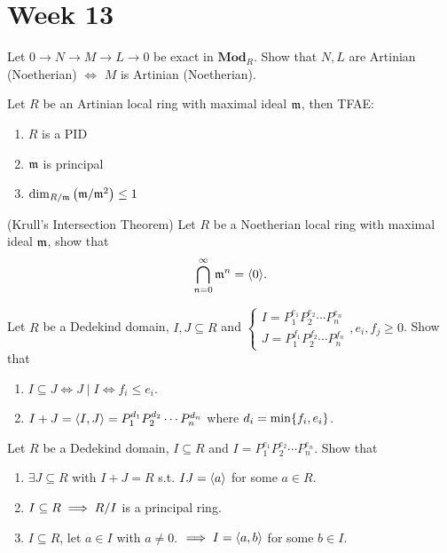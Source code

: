 
\section{Week 13}

\begin{exercise}
  Let $0 \to N \to M \to L \to 0$ be exact in $\mathbf{Mod}_R$.
  Show that $N, L$ are Artinian (Noetherian) $\iff$ $M$ is Artinian (Noetherian).
\end{exercise}

\begin{exercise}
  Let $R$ be an Artinian local ring with maximal ideal $\mathfrak{m}$, 
  then TFAE:
  \begin{enumerate}
    \item $R$ is a PID
    \item $\mathfrak{m}$ is principal
    \item $\dim_{R/\mathfrak{m}} \left( \mathfrak{m}/\mathfrak{m}^2 \right) \leq 1$
  \end{enumerate}
\end{exercise}

\begin{exercise}{(Krull's Intersection Theorem)}
  Let $R$ be a Noetherian local ring with maximal ideal $\mathfrak{m}$, show that
  \[ \bigcap\limits_{n=0}^{\infty} \mathfrak{m}^n = \langle0\rangle. \]
\end{exercise}

\begin{exercise}
  Let $R$ be a Dedekind domain, $I, J \subseteq R$ and
  $\begin{cases}
    I = P_1^{e_1}P_2^{e_2} \dotsm P_n^{e_n} \\
    J = P_1^{f_1}P_2^{f_2} \dotsm P_n^{f_n}
  \end{cases}, e_i, f_j \ge 0$.
  Show that
  \begin{enumerate}
    \item $I \subseteq J \iff J \mid I \iff f_i \le e_i$.
    \item $I + J = \langle I, J\rangle = P_1^{d_1}P_2^{d_2} \dotsm P_n^{d_n}$ where
      $d_i = \min\lbrace f_i, e_i\rbrace$.
  \end{enumerate}
\end{exercise}

\begin{exercise}
  Let $R$ be a Dedekind domain, $I \subseteq R$ and $I = P_1^{e_1}P_2^{e_2} \dotsm P_n^{e_n}$.
  Show that
  \begin{enumerate}
    \item $\exists J \subseteq R$ with $I+J = R$ s.t. $IJ=\langle a\rangle$ for some
      $a \in R$.
    \item $I \subseteq R \implies {R}/{I}$ is a principal ring.
    \item $I \subseteq R$, let $a \in I$ with $a \ne 0$. $\implies I = \langle a, b\rangle$
      for some $b\in I$.
  \end{enumerate}
\end{exercise}
